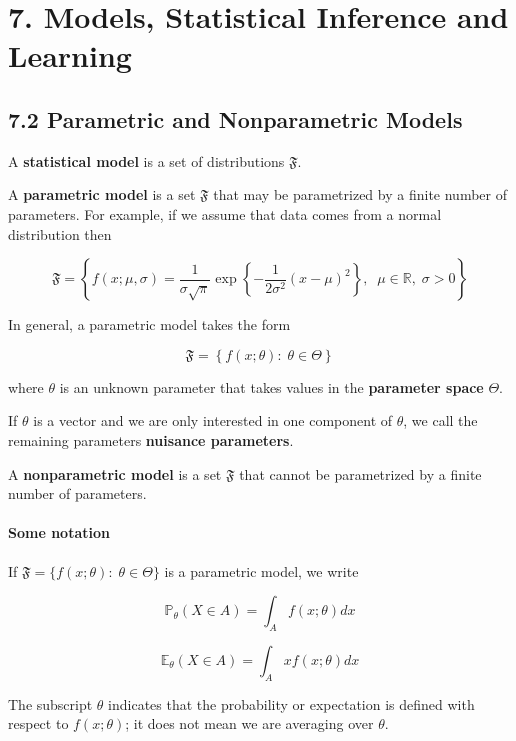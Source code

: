 \section*{7. Models, Statistical Inference and Learning}\label{models-statistical-inference-and-learning}

\subsection*{7.2 Parametric and Nonparametric
Models}\label{parametric-and-nonparametric-models}

A \textbf{statistical model} is a set of distributions \(\mathfrak{F}\).

A \textbf{parametric model} is a set \(\mathfrak{F}\) that may be
parametrized by a finite number of parameters. For example, if we assume
that data comes from a normal distribution then

\[ \mathfrak{F} = \left\{ f(x; \mu, \sigma) = 
\frac{1}{\sigma\sqrt{\pi}} \exp \left\{ -\frac{1}{2\sigma^{2}} \left(x - \mu \right)^{2} \right\}, \; \; 
\mu \in \mathbb{R}, \; \sigma > 0
\right\} \]

In general, a parametric model takes the form

\[ \mathfrak{F} = \left\{ f(x; \theta) : \; \theta \in \Theta \right\} \]

where \(\theta\) is an unknown parameter that takes values in the
\textbf{parameter space} \(\Theta\).

If \(\theta\) is a vector and we are only interested in one component of
\(\theta\), we call the remaining parameters \textbf{nuisance
parameters}.

A \textbf{nonparametric model} is a set \(\mathfrak{F}\) that cannot be
parametrized by a finite number of parameters.

\paragraph{Some notation}\label{some-notation}

If \(\mathfrak{F} = \{ f(x; \theta) : \; \theta \in \Theta \}\) is a
parametric model, we write

\[\mathbb{P}_\theta(X \in A) = \int_A f(x; \theta)dx\]

\[\mathbb{E}_\theta(X \in A) = \int_A x f(x; \theta)dx\]

The subscript \(\theta\) indicates that the probability or expectation
is defined with respect to \(f(x; \theta)\); it does not mean we are
averaging over \(\theta\).

